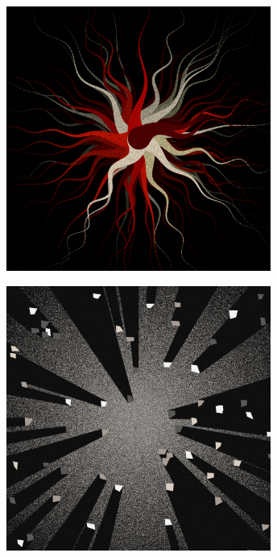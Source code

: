 \documentclass[11pt,twoside]{book}
\begin{document}
\begin{figure}[!ht]
\includegraphics[width=246pt]{constructivist-a93d80bf-e596-4fab-8dfd-7630c3b41296.png}
\end{figure}
\newpage
{}
\fancyfoot[CE,CO]{\fontsize{10}{12}\selectfont \thepage}
\begin{figure}[!ht]
\includegraphics[width=246pt]{cool-bw-296d7c2a-a3ea-486e-822d-baf73ea251e6.png}
\end{figure}
\newpage
{}
\fancyfoot[CE,CO]{\fontsize{10}{12}\selectfont \thepage}
\end{document}
